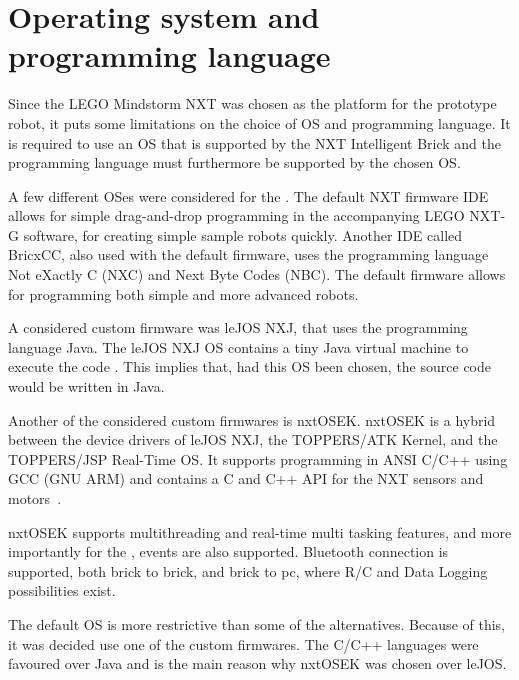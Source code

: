 \section{Operating system and programming language} \label{sec:os_and_proglanguage}
Since the LEGO Mindstorm NXT was chosen as the platform for the prototype robot, it puts some limitations on the choice of OS and programming language. It is required to use an OS that is supported by the NXT Intelligent Brick and the programming language must furthermore be supported by the chosen OS.

A few different OSes were considered for the \projname{}. The default NXT firmware IDE allows for simple drag-and-drop programming in the accompanying LEGO NXT-G software, for creating simple sample robots quickly. Another IDE called BricxCC, also used with the default firmware, uses the programming language Not eXactly C (NXC) and Next Byte Codes (NBC). The default firmware allows for programming both simple and more advanced robots. 

A considered custom firmware was leJOS NXJ, that uses the programming language Java. The leJOS NXJ OS contains a tiny Java virtual machine to execute the code \citep{lejos}. This implies that, had this OS been chosen, the source code would be written in Java.

Another of the considered custom firmwares is nxtOSEK. nxtOSEK is a hybrid between the device drivers of leJOS NXJ, the TOPPERS/ATK Kernel, and the TOPPERS/JSP Real-Time OS. It supports programming in ANSI C/C++ using GCC (GNU ARM) and contains a C and C++ API for the NXT sensors and motors~\citep{nxtosek, toppers_atk, toppers_jsp, nxtOSEK2, nxtosek_api}.

nxtOSEK supports multithreading and real-time multi tasking features, and more importantly for the \projname{}, events are also supported. Bluetooth connection is supported, both brick to brick, and brick to pc, where R/C and Data Logging possibilities exist.

The default OS is more restrictive than some of the alternatives. Because of this, it was decided use one of the custom firmwares. The C/C++ languages were favoured over Java and is the main reason why nxtOSEK was chosen over leJOS.

